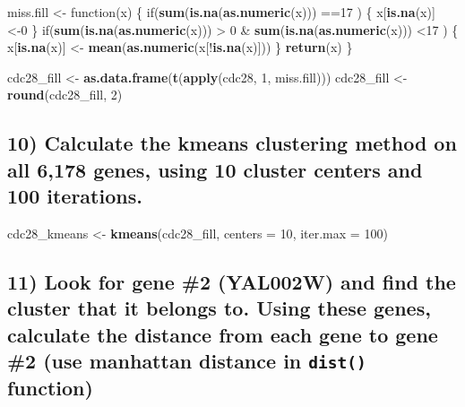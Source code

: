 \documentclass[]{article}
\newenvironment{Shaded}{\begin{snugshade}}{\end{snugshade}}
\newcommand{\KeywordTok}[1]{\textcolor[rgb]{0.13,0.29,0.53}{\textbf{{#1}}}}
\newcommand{\DataTypeTok}[1]{\textcolor[rgb]{0.13,0.29,0.53}{{#1}}}
\newcommand{\DecValTok}[1]{\textcolor[rgb]{0.00,0.00,0.81}{{#1}}}
\newcommand{\StringTok}[1]{\textcolor[rgb]{0.31,0.60,0.02}{{#1}}}
\newcommand{\NormalTok}[1]{{#1}}
\begin{document}
\begin{Shaded}
\begin{Highlighting}[]
\NormalTok{miss.fill <-}\StringTok{ }\NormalTok{function(x) \{}
    \NormalTok{if(}\KeywordTok{sum}\NormalTok{(}\KeywordTok{is.na}\NormalTok{(}\KeywordTok{as.numeric}\NormalTok{(x))) ==}\DecValTok{17} \NormalTok{) \{}
        \NormalTok{x[}\KeywordTok{is.na}\NormalTok{(x)] <-}\DecValTok{0}
    \NormalTok{\}}
    \NormalTok{if(}\KeywordTok{sum}\NormalTok{(}\KeywordTok{is.na}\NormalTok{(}\KeywordTok{as.numeric}\NormalTok{(x))) >}\StringTok{ }\DecValTok{0} \NormalTok{&}\StringTok{ }\KeywordTok{sum}\NormalTok{(}\KeywordTok{is.na}\NormalTok{(}\KeywordTok{as.numeric}\NormalTok{(x))) <}\DecValTok{17} \NormalTok{) \{}
        \NormalTok{x[}\KeywordTok{is.na}\NormalTok{(x)] <-}\StringTok{ }\KeywordTok{mean}\NormalTok{(}\KeywordTok{as.numeric}\NormalTok{(x[!}\KeywordTok{is.na}\NormalTok{(x)]))}
    \NormalTok{\}}
    \KeywordTok{return}\NormalTok{(x)}
\NormalTok{\}}

\NormalTok{cdc28_fill <-}\StringTok{ }\KeywordTok{as.data.frame}\NormalTok{(}\KeywordTok{t}\NormalTok{(}\KeywordTok{apply}\NormalTok{(cdc28, }\DecValTok{1}\NormalTok{, miss.fill)))}
\NormalTok{cdc28_fill <-}\StringTok{ }\KeywordTok{round}\NormalTok{(cdc28_fill, }\DecValTok{2}\NormalTok{)}
\end{Highlighting}
\end{Shaded}

\subsection{10) Calculate the kmeans clustering method on all 6,178
genes, using 10 cluster centers and 100
iterations.}\label{calculate-the-kmeans-clustering-method-on-all-6178-genes-using-10-cluster-centers-and-100-iterations.}

\begin{Shaded}
\begin{Highlighting}[]
\NormalTok{cdc28_kmeans <-}\StringTok{ }\KeywordTok{kmeans}\NormalTok{(cdc28_fill, }\DataTypeTok{centers =} \DecValTok{10}\NormalTok{, }\DataTypeTok{iter.max =} \DecValTok{100}\NormalTok{)}
\end{Highlighting}
\end{Shaded}

\subsection{\texorpdfstring{11) Look for gene \#2 (YAL002W) and find the
cluster that it belongs to. Using these genes, calculate the distance
from each gene to gene \#2 (use manhattan distance in \texttt{dist()}
function)}{11) Look for gene \#2 (YAL002W) and find the cluster that it belongs to. Using these genes, calculate the distance from each gene to gene \#2 (use manhattan distance in dist() function)}}\label{look-for-gene-2-yal002w-and-find-the-cluster-that-it-belongs-to.-using-these-genes-calculate-the-distance-from-each-gene-to-gene-2-use-manhattan-distance-in-dist-function}
\end{document}
